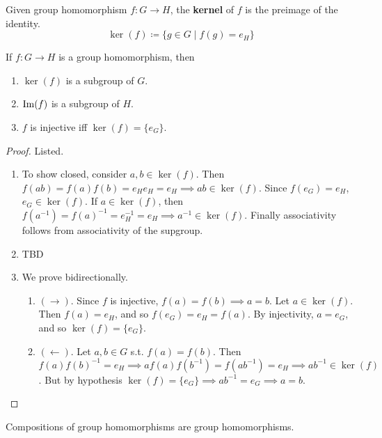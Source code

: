   \begin{definition}[Kernel]
    Given group homomorphism $f: G \rightarrow H$, the \textbf{kernel} of $f$ is the preimage of the identity. 
    \begin{equation}
      \ker(f) \coloneqq \{g \in G \mid f(g) = e_H\}
    \end{equation}
  \end{definition} 

  \begin{theorem}
    \label{thm:kernels_subgroup}
    If $f: G \to H$ is a group homomorphism, then 
    \begin{enumerate}
      \item $\ker(f)$ is a subgroup of $G$.  
      \item $\operatorname{Im}(f)$ is a subgroup of $H$.  
      \item $f$ is injective iff $\ker(f) = \{e_G\}$. 
    \end{enumerate}
  \end{theorem}
  \begin{proof}
    Listed. 
    \begin{enumerate}
      \item To show closed, consider $a, b \in \ker(f)$. Then $f(ab) = f(a) f(b) = e_H e_H = e_H \implies ab \in \ker(f)$. Since $f(e_G) = e_H$, $e_G \in \ker(f)$. If $a \in \ker(f)$, then $f(a^{-1}) = f(a)^{-1} = e_H^{-1} = e_H \implies a^{-1} \in \ker(f)$. Finally associativity follows from associativity of the supgroup. 
      \item TBD 
      \item We prove bidirectionally. 
      \begin{enumerate}
        \item $(\rightarrow)$. Since $f$ is injective, $f(a) = f(b) \implies a = b$. Let $a \in \ker(f)$. Then $f(a) = e_H$, and so $f(e_G) = e_H = f(a)$. By injectivity, $a = e_G$, and so $\ker(f) = \{e_G\}$. 
        \item $(\leftarrow)$. Let $a, b \in G$ s.t. $f(a) = f(b)$. Then $f(a) f(b)^{-1} = e_H \implies af(a) f(b^{-1}) = f(a b^{-1}) = e_H \implies ab^{-1} \in \ker(f)$. But by hypothesis $\ker(f) = \{e_G\} \implies ab^{-1} = e_G \implies a = b$. 
      \end{enumerate}
    \end{enumerate}
  \end{proof}

  \begin{theorem}
    Compositions of group homomorphisms are group homomorphisms. 
  \end{theorem}

